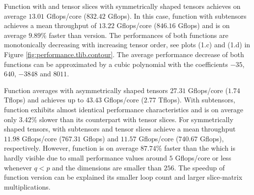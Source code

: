 Function  with \allowbreak{} and tensor slices with symmetrically shaped tensors achieves on average $13.01$ Gflops/core ($832.42$ Gflops).
In this case, function \allowbreak{} with subtensors achieves a mean throughput of $13.22$ Gflops/core ($846.16$ Gflops) and is on average $9.89$\% faster than  version.
The performances of both functions are monotonically decreasing with increasing tensor order, see plots (1.c) and (1.d) in Figure \ref{fig:performance.tlib.contour}.
The average performance decrease of both functions can be approximated by a cubic polynomial with the coefficients $-35$, $640$, $-3848$ and $8011$.

Function \allowbreak{}\allowbreak{} averages with asymmetrically shaped tensors $27.31$ Gflops/core ($1.74$ Tflops) and achieves up to $43.43$ Gflops/core ($2.77$ Tflops).
With subtensors, function \allowbreak{} exhibits almost identical performance characteristics and is on average only $3.42$\% slower than its counterpart with tensor slices.
For symmetrically shaped tensors, \allowbreak{} with subtensors and tensor slices achieve a mean throughput $11.98$ Gflops/core ($767.31$ Gflops) and $11.57$ Gflops/core ($740.67$ Gflops), respectively.
However, function  is on average $87.74$\% faster than the  which is hardly visible due to small performance values around $5$ Gflops/core or less whenever $q<p$ and the dimensions are smaller than $256$.
The speedup of function  version can be explained its smaller loop count and larger slice-matrix multiplications.



